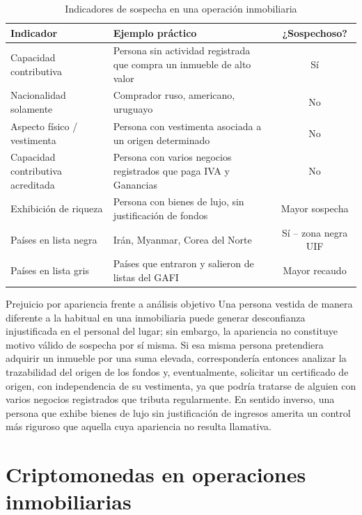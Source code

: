 \documentclass[12pt,oneside]{book}
\begin{document}
\begin{table}[H]
\centering
\caption{Indicadores de sospecha en una operación inmobiliaria}
\begin{tabularx}{\textwidth}{>{\raggedright\arraybackslash}X >{\raggedright\arraybackslash}X c}
\toprule
\textbf{Indicador} & \textbf{Ejemplo práctico} & \textbf{¿Sospechoso?} \\
\midrule
Capacidad contributiva & Persona sin actividad registrada que compra un inmueble de alto valor & Sí \\
Nacionalidad solamente & Comprador ruso, americano, uruguayo & No \\
Aspecto físico / vestimenta & Persona con vestimenta asociada a un origen determinado & No \\
Capacidad contributiva acreditada & Persona con varios negocios registrados que paga IVA y Ganancias & No \\
Exhibición de riqueza & Persona con bienes de lujo, sin justificación de fondos & Mayor sospecha \\
Países en lista negra & Irán, Myanmar, Corea del Norte & Sí -- zona negra UIF \\
Países en lista gris & Países que entraron y salieron de listas del GAFI & Mayor recaudo \\
\bottomrule
\end{tabularx}
\end{table}

\begin{example}{Prejuicio por apariencia frente a análisis objetivo}
Una persona vestida de manera diferente a la habitual en una inmobiliaria puede generar desconfianza injustificada en el personal del lugar; sin embargo, la apariencia no constituye motivo válido de sospecha por sí misma. Si esa misma persona pretendiera adquirir un inmueble por una suma elevada, correspondería entonces analizar la trazabilidad del origen de los fondos y, eventualmente, solicitar un certificado de origen, con independencia de su vestimenta, ya que podría tratarse de alguien con varios negocios registrados que tributa regularmente. En sentido inverso, una persona que exhibe bienes de lujo sin justificación de ingresos amerita un control más riguroso que aquella cuya apariencia no resulta llamativa.
\end{example}

\section{Criptomonedas en operaciones inmobiliarias}
\end{document}
